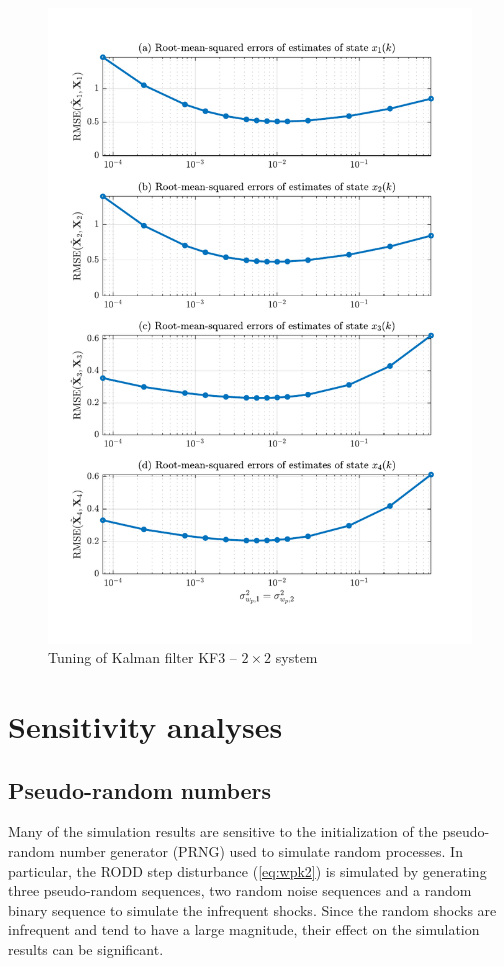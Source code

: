 	\begin{figure}[htp]
		\centering
		\includegraphics[width=14cm]{images/rod_obs_sim2_3KF_Q_seed_0.pdf}
		\caption{Tuning of Kalman filter KF3 – $2\times2$ system}
		\label{fig:sim-sys-2x2-KF3-tuning}
	\end{figure}
	

\section{Sensitivity analyses}

\subsection{Pseudo-random numbers}

Many of the simulation results are sensitive to the initialization of the pseudo-random number generator (PRNG) used to simulate random processes. In particular, the RODD step disturbance (\ref{eq:wpk2}) is simulated by generating three pseudo-random sequences, two random noise sequences and a random binary sequence to simulate the infrequent shocks.  Since the random shocks are infrequent and tend to have a large magnitude, their effect on the simulation results can be significant.

